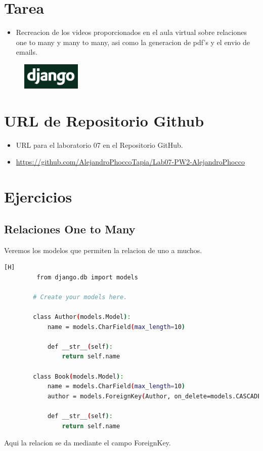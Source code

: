 \documentclass{article}
\begin{document}
	\section{Tarea}
	\begin{itemize}		
		\item Recreacion de los videos proporcionados en el aula virtual sobre relaciones one to many y many to many, asi como la generacion de pdf's y el envio de emails.
	\end{itemize}
        \begin{figure}[H]
		\centering
		\includegraphics[width=0.25\textwidth,keepaspectratio]{img/django.png}
	\end{figure}

	\section{URL de Repositorio Github}
	\begin{itemize}
		\item URL para el laboratorio 07 en el Repositorio GitHub.
		\item \url{https://github.com/AlejandroPhoccoTapia/Lab07-PW2-AlejandroPhocco}
	\end{itemize}
	
	\section{Ejercicios}  
 
	\subsection{Relaciones One to Many}
        Veremos los modelos que permiten la relacion de uno a muchos.

        \begin{lstlisting}[language=bash,caption={models.py de la app}][H]
         from django.db import models
        
        # Create your models here.
        
        class Author(models.Model):
            name = models.CharField(max_length=10)
        
            def __str__(self):
                return self.name
        
        class Book(models.Model):
            name = models.CharField(max_length=10)
            author = models.ForeignKey(Author, on_delete=models.CASCADE)
        
            def __str__(self):
                return self.name
	\end{lstlisting}
        Aqui la relacion se da mediante  el campo ForeignKey.
\end{document}
